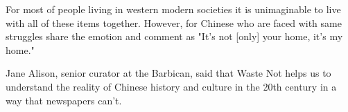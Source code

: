 For most of people living in western modern societies it is unimaginable to live with all of these items together. However, for Chinese who are faced with same struggles share the emotion and  comment as "It's not [only] your home, it's my home."

Jane Alison, senior curator at the Barbican, said that Waste Not helps us to understand the reality of Chinese history and culture in the 20th century in a way that newspapers can't.






